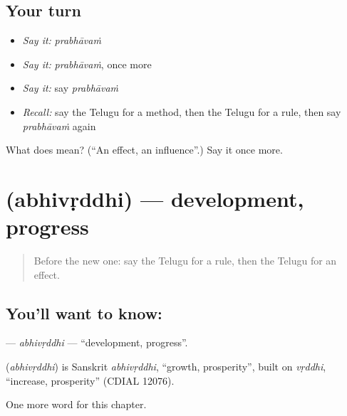 \subsection*{Your turn}
\begin{itemize}
\raggedright
  \item \emph{Say it:} \emph{prabhāvaṁ}
  \item \emph{Say it:} \emph{prabhāvaṁ}, once more
  \item \emph{Say it:} say \emph{prabhāvaṁ}
  \item \emph{Recall:} say the Telugu for a method, then the Telugu for a rule, then say \emph{prabhāvaṁ} again
\end{itemize}

\begin{tcolorbox}[breakable,colback=teal!4,colframe=teal!35!black,title={Before you move on}]
What does  mean? (\textquotedblleft{}An effect, an influence\textquotedblright{}.) Say it once more.
\end{tcolorbox}
\section[\texorpdfstring{\te{అభివృద్ధి} (abhivṛddhi)}{అభివృద్ధి (abhivṛddhi)}]{ (abhivṛddhi) — development, progress}

\label{lesson:TE-C258-abhivrddhi}



\begin{quote}
Before the new one: say the Telugu for a rule, then the Telugu for an effect.
\end{quote}

\subsection*{You'll want to know: }
\textbf{} — \emph{abhivṛddhi} — \textquotedblleft{}development, progress\textquotedblright{}.

\begin{cousinweb}
\textbf{} (\emph{abhivṛddhi}) is Sanskrit \emph{abhivṛddhi}, \textquotedblleft{}growth, prosperity\textquotedblright{}, built on \emph{vṛddhi}, \textquotedblleft{}increase, prosperity\textquotedblright{} (CDIAL 12076).
\end{cousinweb}

\begin{grammarlens}[title={What you've built}]
One more word for this chapter.
\end{grammarlens}

